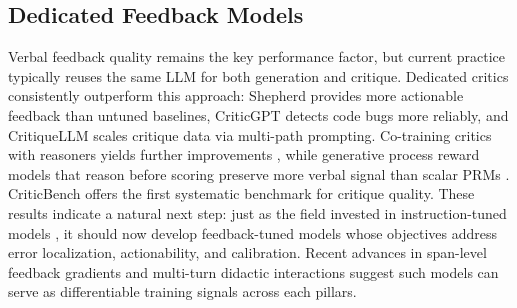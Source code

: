 




\subsection{Dedicated Feedback Models}
\label{sec:Feedback_models}
Verbal feedback quality remains the key performance factor, but current practice typically reuses the same LLM for both generation and critique. Dedicated critics consistently outperform this approach: Shepherd \citep{wang2023shepherd} provides more actionable feedback than untuned baselines, CriticGPT \citep{mcaleese2024criticgpt} detects code bugs more reliably, and CritiqueLLM \citep{ke2024critiquellm} scales critique data via multi-path prompting. Co-training critics with reasoners yields further improvements \citep{liu2026generativeadversarialreasonerenhancing}, while generative process reward models that reason before scoring preserve more verbal signal than scalar PRMs \citep{khalifa2025processrewardmodelsthink}. CriticBench \citep{lin2024criticbench} offers the first systematic benchmark for critique quality.  These results indicate a natural next step: just as the field invested in instruction-tuned models \citep{ouyang2022training}, it should now develop feedback-tuned models whose objectives address error localization, actionability, and calibration. Recent advances in span-level feedback gradients \citep{wang2026text2gradreinforcementlearningnatural} and multi-turn didactic interactions \citep{klissarov2026improving} suggest such models can serve as differentiable training signals across each pillars.




 
